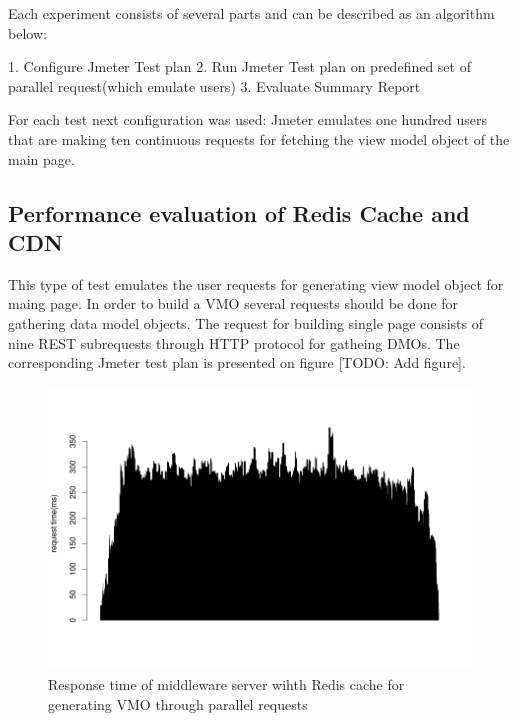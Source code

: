 Each experiment consists of several parts and can be described as an algorithm below: 

1. Configure Jmeter Test plan
2. Run Jmeter Test plan on predefined set of parallel request(which emulate users)
3. Evaluate Summary Report

For each test next configuration was used: Jmeter emulates one hundred users that are making ten continuous requests for fetching the view model object of the main page.  


\subsection{Performance evaluation of Redis Cache and CDN}

This type of test emulates the user requests for generating view model object for maing page. In order to build a VMO several requests should be done for gathering data model objects. The request for building single page consists of nine REST subrequests through HTTP protocol for gatheing DMOs.  The corresponding Jmeter test plan is presented on figure [TODO: Add figure].


\begin{figure}[h]
    \centering
    \includegraphics[width=\textwidth]{images/vmo_redis_mult_par.png}
    \caption{Response time of middleware server wihth Redis cache for generating VMO through parallel requests}
    \label{fig:vmo_redis_mult_par}
\end{figure}

